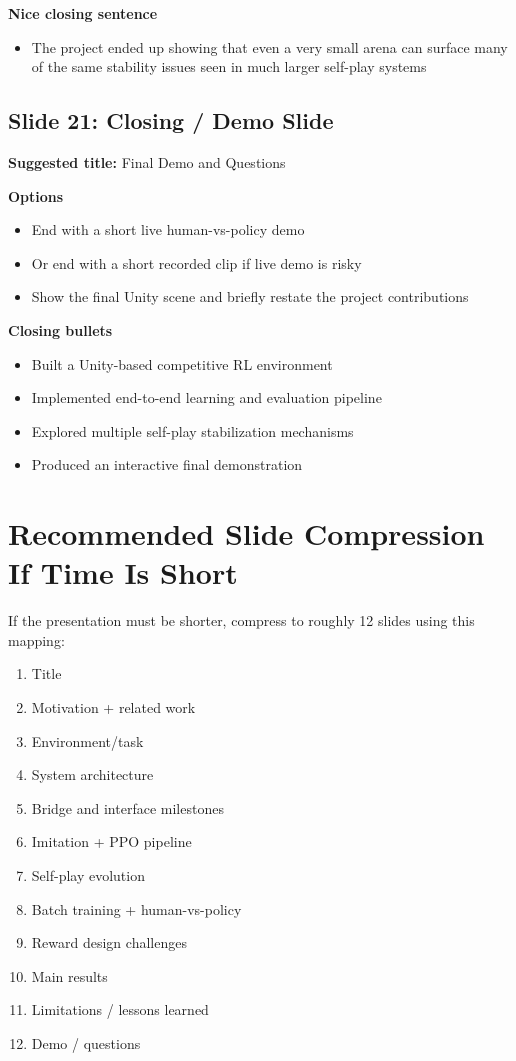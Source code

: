 \documentclass[11pt]{article}
\begin{document}
\textbf{Nice closing sentence}
\begin{itemize}
    \item The project ended up showing that even a very small arena can surface many of the same stability issues seen in much larger self-play systems
\end{itemize}

\subsection*{Slide 21: Closing / Demo Slide}

\textbf{Suggested title:} Final Demo and Questions

\textbf{Options}
\begin{itemize}
    \item End with a short live human-vs-policy demo
    \item Or end with a short recorded clip if live demo is risky
    \item Show the final Unity scene and briefly restate the project contributions
\end{itemize}

\textbf{Closing bullets}
\begin{itemize}
    \item Built a Unity-based competitive RL environment
    \item Implemented end-to-end learning and evaluation pipeline
    \item Explored multiple self-play stabilization mechanisms
    \item Produced an interactive final demonstration
\end{itemize}

\section{Recommended Slide Compression If Time Is Short}

If the presentation must be shorter, compress to roughly 12 slides using this mapping:

\begin{enumerate}
    \item Title
    \item Motivation + related work
    \item Environment/task
    \item System architecture
    \item Bridge and interface milestones
    \item Imitation + PPO pipeline
    \item Self-play evolution
    \item Batch training + human-vs-policy
    \item Reward design challenges
    \item Main results
    \item Limitations / lessons learned
    \item Demo / questions
\end{enumerate}
\end{document}
